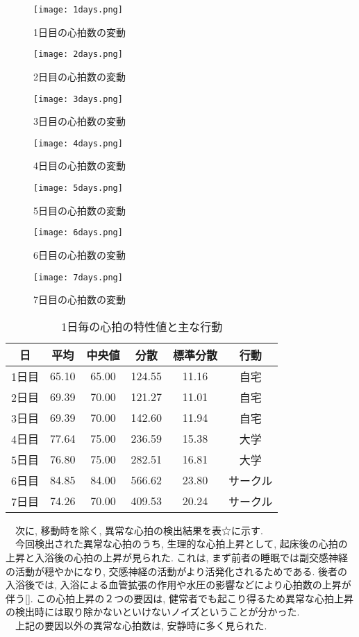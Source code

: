 \documentclass[report, 11pt, a4paper]{jsbook}
\begin{document}
\begin{figure}[H]
\centering
\texttt{[image: 1days.png]}
\caption{1日目の心拍数の変動}
\texttt{[image: 2days.png]}
\caption{2日目の心拍数の変動}
\texttt{[image: 3days.png]}
\caption{3日目の心拍数の変動}
\label{fig:goolge_trends}
\end{figure}

\begin{figure}[H]
\centering
\texttt{[image: 4days.png]}
\caption{4日目の心拍数の変動}
\texttt{[image: 5days.png]}
\caption{5日目の心拍数の変動}
\texttt{[image: 6days.png]}
\caption{6日目の心拍数の変動}
\label{fig:goolge_trends}
\end{figure}

\begin{figure}[H]
\centering
\texttt{[image: 7days.png]}
\caption{7日目の心拍数の変動}
\label{fig:goolge_trends}
\end{figure}

\begin{table}[H]
\centering
\caption{1日毎の心拍の特性値と主な行動}
\begin{tabular}{cccccc}
\hline
日  & 平均    & 中央値   & 分散     & 標準分散  & 行動   \\ \hline
1日目 & 65.10 & 65.00 & 124.55 & 11.16 & 自宅   \\
2日目 & 69.39 & 70.00 & 121.27 & 11.01 & 自宅   \\
3日目 & 69.39 & 70.00 & 142.60 & 11.94 & 自宅   \\
4日目 & 77.64 & 75.00 & 236.59 & 15.38 & 大学   \\
5日目 & 76.80 & 75.00 & 282.51 & 16.81 & 大学   \\
6日目 & 84.85 & 84.00 & 566.62 & 23.80 & サークル \\
7日目 & 74.26 & 70.00 & 409.53 & 20.24 & サークル \\ \hline
\end{tabular}
\end{table}

　次に, 移動時を除く, 異常な心拍の検出結果を表☆に示す. \\
　今回検出された異常な心拍のうち, 生理的な心拍上昇として, 起床後の心拍の上昇と入浴後の心拍の上昇が見られた. これは, まず前者の睡眠では副交感神経の活動が穏やかになり, 交感神経の活動がより活発化されるためである. 後者の入浴後では, 入浴による血管拡張の作用や水圧の影響などにより心拍数の上昇が伴う[]. この心拍上昇の２つの要因は, 健常者でも起こり得るため異常な心拍上昇の検出時には取り除かないといけないノイズということが分かった. \\
　上記の要因以外の異常な心拍数は, 安静時に多く見られた. 
\end{document}
